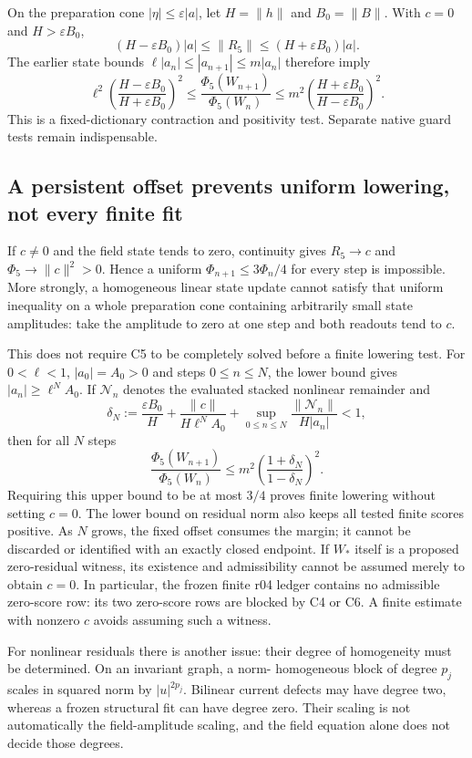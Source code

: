 \documentclass[11pt,a4paper]{article}
\begin{document}
On the preparation cone $|\eta|\leq\varepsilon|a|$, let
$H=\|h\|$ and $B_0=\|B\|$. With $c=0$ and
$H>\varepsilon B_0$,
\[
 (H-\varepsilon B_0)|a|\leq\|R_5\|
       \leq(H+\varepsilon B_0)|a|.
\]
The earlier state bounds $\ell|a_n|\leq|a_{n+1}|\leq m|a_n|$
therefore imply
\[
 \ell^2\left(\frac{H-\varepsilon B_0}{H+\varepsilon B_0}\right)^2
 \leq\frac{\Phi_5(W_{n+1})}{\Phi_5(W_n)}
 \leq m^2\left(\frac{H+\varepsilon B_0}{H-\varepsilon B_0}\right)^2.
\]
This is a fixed-dictionary contraction and positivity test.
Separate native guard tests remain indispensable.

\subsection{A persistent offset prevents uniform lowering, not every finite fit}

If $c\ne0$ and the field state tends to zero, continuity gives
$R_5\to c$ and $\Phi_5\to\|c\|^2>0$. Hence a uniform
$\Phi_{n+1}\leq3\Phi_n/4$ for every step is impossible.
More strongly, a homogeneous linear state update cannot satisfy
that uniform inequality on a whole preparation cone containing
arbitrarily small state amplitudes: take the amplitude to zero
at one step and both readouts tend to $c$.

This does not require C5 to be completely solved before a finite
lowering test. For $0<\ell<1$, $|a_0|=A_0>0$ and steps
$0\leq n\leq N$, the lower bound gives $|a_n|\geq\ell^N A_0$.
If $\mathcal N_n$ denotes the evaluated stacked nonlinear
remainder and
\[
 \delta_N:=\frac{\varepsilon B_0}{H}
       +\frac{\|c\|}{H\ell^N A_0}
       +\sup_{0\leq n\leq N}
          \frac{\|\mathcal N_n\|}{H|a_n|}<1,
\]
then for all $N$ steps
\[
 \frac{\Phi_5(W_{n+1})}{\Phi_5(W_n)}
 \leq m^2\left(\frac{1+\delta_N}{1-\delta_N}\right)^2.
\]
Requiring this upper bound to be at most $3/4$ proves finite
lowering without setting $c=0$. The lower bound on residual
norm also keeps all tested finite scores positive. As $N$ grows,
the fixed offset consumes the margin; it cannot be discarded
or identified with an exactly closed endpoint.
If $W_*$ itself is a proposed zero-residual witness, its existence
and admissibility cannot be assumed merely to obtain $c=0$.
In particular, the frozen finite r04 ledger contains no admissible
zero-score row: its two zero-score rows are blocked by C4 or C6.
A finite estimate with nonzero $c$ avoids assuming such a witness.

For nonlinear residuals there is another issue: their degree of
homogeneity must be determined. On an invariant graph, a norm-
homogeneous block of degree $p_j$ scales in squared norm by
$|u|^{2p_j}$. Bilinear current defects may have degree two,
whereas a frozen structural fit can have degree zero. Their
scaling is not automatically the field-amplitude scaling, and
the field equation alone does not decide those degrees.
\end{document}
